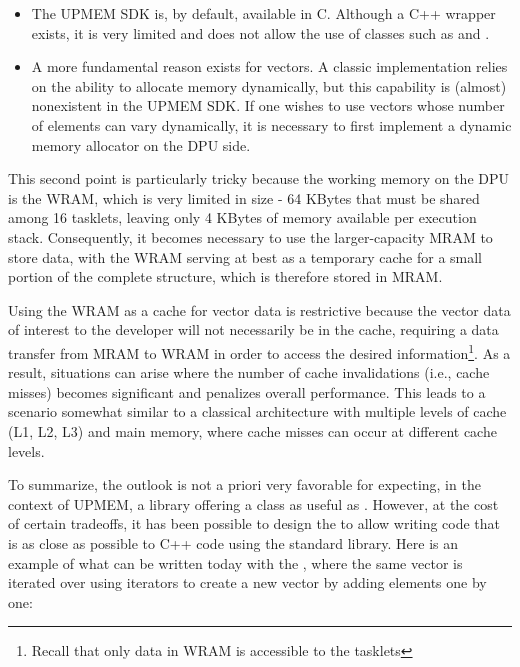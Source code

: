 \begin{itemize}

\item The UPMEM SDK is, by default, available in C. Although a C++ wrapper exists, it is very limited and does not allow the use of classes such as  and .

\item A more fundamental reason exists for vectors. A classic implementation relies on the ability to allocate memory dynamically,  but this capability is (almost) nonexistent in the UPMEM SDK. If one wishes to use vectors whose number of elements  can vary dynamically, it is necessary to first implement a dynamic memory allocator on the DPU side.

\end{itemize}	

This second point is particularly tricky because the working memory on the DPU is the WRAM, which is very limited in size - 64 KBytes that must be shared among 16 tasklets, leaving only 4 KBytes of memory available per execution stack. Consequently, it becomes necessary to use the larger-capacity MRAM to store data, with the WRAM serving at best as a temporary cache for a small portion of the complete structure, which is therefore stored in MRAM.

Using the WRAM as a cache for vector data is restrictive because the vector data of interest to the developer will not necessarily be in the cache, requiring a data transfer from MRAM to WRAM in order to access the desired information\footnote{Recall that only data in WRAM is accessible to the tasklets}. As a result, situations can arise where the number of cache invalidations (i.e., cache misses) becomes significant and penalizes overall performance. This leads to a scenario somewhat similar to a classical architecture with multiple levels of cache (L1, L2, L3) and main memory, where cache misses can occur at different cache levels.

To summarize, the outlook is not a priori very favorable for expecting, in the context of UPMEM, a library offering a class as useful as . However, at the cost of certain tradeoffs,  it has been possible to design the \BPL to allow writing code that is as close as possible to C++ code using the standard library. Here is an example of what can be written today with the \BPL, where the same vector is iterated over using iterators  to create a new vector by adding elements one by one:

